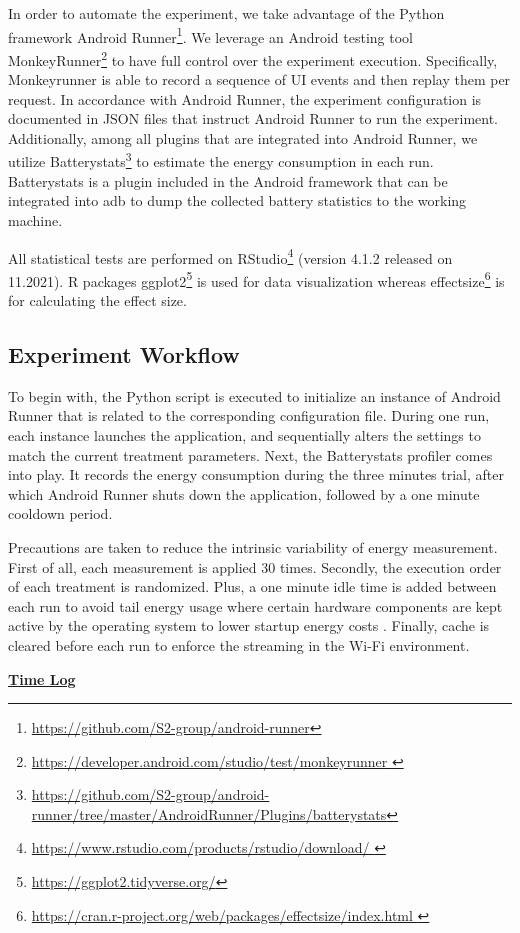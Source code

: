 In order to automate the experiment, we take advantage of the Python framework Android Runner\footnote{\label{note1}\href{ https://github.com/S2-group/android-runner }{https://github.com/S2-group/android-runner}}. We leverage an Android testing tool MonkeyRunner\footnote{\label{note1}\href{ https://developer.android.com/studio/test/monkeyrunner  }{https://developer.android.com/studio/test/monkeyrunner }} to have full control over the experiment execution. Specifically, Monkeyrunner is able to record a sequence of UI events and then replay them per request. In accordance with Android Runner, the experiment configuration is documented in JSON files that instruct Android Runner to run the experiment. Additionally, among all plugins that are integrated into Android Runner, we utilize Batterystats\footnote{\label{note1}\href{ https://github.com/S2-group/android-runner/tree/master/AndroidRunner/Plugins/batterystats}{\url{https://github.com/S2-group/android-runner/tree/master/AndroidRunner/Plugins/batterystats}}} to estimate the energy consumption in each run. {\color{blue}Batterystats is a plugin included in the Android framework that can be integrated into adb to dump the collected battery statistics to the working machine. }

All statistical tests are performed on RStudio\footnote{\label{note1}\href{ https://www.rstudio.com/products/rstudio/download/    }{https://www.rstudio.com/products/rstudio/download/ }} (version 4.1.2 released on 11.2021). R packages ggplot2\footnote{\label{note1}\href{ https://ggplot2.tidyverse.org/   }{https://ggplot2.tidyverse.org/}} is used for data visualization whereas effectsize\footnote{\label{note1}\href{  https://cran.r-project.org/web/packages/effectsize/index.html    }{ https://cran.r-project.org/web/packages/effectsize/index.html }} is for calculating the effect size. 

\subsection{Experiment Workflow}
To begin with, the Python script is executed to initialize an instance of Android Runner that is related to the corresponding configuration file. During one run, each instance launches the application, and sequentially alters the settings to match the current treatment parameters. Next, the Batterystats profiler comes into play. It records the energy consumption during the three minutes trial, after which Android Runner shuts down the application, followed by a one minute cooldown period. 

Precautions are taken to reduce the intrinsic variability of energy measurement. First of all, each measurement is applied 30 times. Secondly, the execution order of each treatment is randomized. Plus, a one minute idle time is added between each run to avoid tail energy usage where certain hardware components are kept active by the operating system to lower startup energy costs \cite{li2013calculating}. Finally, cache is cleared before each run to enforce the streaming in the Wi-Fi environment. 

\href{https://docs.google.com/spreadsheets/d/1w2QG47_3Y9-IXbPPSM2fw1bH0ZvWMfadzRdfwqmWBtI/edit?usp=sharing}{\textbf{Time Log}}


